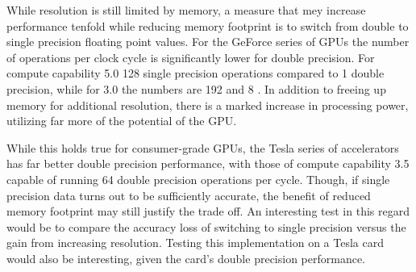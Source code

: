 While resolution is still limited by memory, a measure that mey increase performance tenfold while reducing memory
footprint is to switch from double to single precision floating point values. For the GeForce series of GPUs the number
of operations per clock cycle is significantly lower for double precision. For compute capability 5.0 128 single precision
operations compared to 1 double precision, while for 3.0 the numbers are 192 and 8 \cite[sec.~5.4.1]{cudaprog}.
In addition to freeing up memory for additional resolution, there is a marked increase in processing power, utilizing
far more of the potential of the GPU.

While this holds true for consumer-grade GPUs, the Tesla series of accelerators has far better double precision
performance, with those of compute capability 3.5 capable of running 64 double precision operations per cycle.
Though, if single precision data turns out to be sufficiently accurate, the benefit of reduced memory footprint
may still justify the trade off. An interesting test in this regard would be to compare the accuracy loss of switching to
single precision versus the gain from increasing resolution. Testing this implementation on a Tesla card would also be
interesting, given the card's double precision performance.

